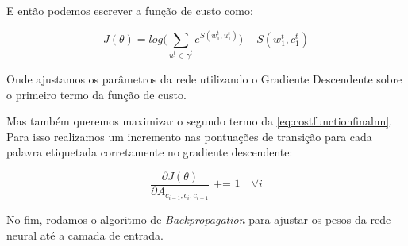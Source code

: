 E então podemos escrever a função de custo como:

\begin{equation} \label{eq:costfunctionfinalnn}
J(\theta) = log\Bigg(\sum\limits_{u_1^t \in \gamma^t} e^{S(w_1^t, u_1^t)} \Bigg) - S(w_1^t, c_1^t)
\end{equation}

Onde ajustamos os parâmetros da rede utilizando o Gradiente Descendente sobre o primeiro termo da função de custo.  

Mas também queremos maximizar o segundo termo da \autoref{eq:costfunctionfinalnn}. Para isso realizamos um incremento nas pontuações de transição para cada palavra etiquetada corretamente no gradiente descendente:

\begin{equation}
\frac{\partial J(\theta)}{\partial A_{c_{i-1}, c_{i}, c_{i+1}}} \text{ += } 1 \quad \forall i \nonumber
\end{equation}

No fim, rodamos o algoritmo de \textit{Backpropagation} para ajustar os pesos da rede neural até a camada de entrada. 